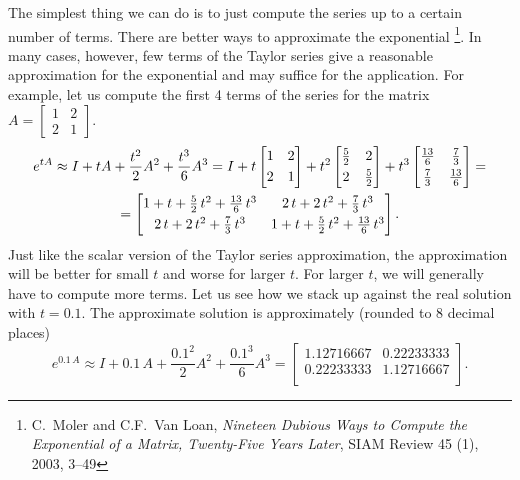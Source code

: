 The simplest thing we can do
is to just compute the series up to a certain number of terms.  There
are better ways to approximate the exponential%
\footnote{C.\ Moler and C.F.\ Van Loan, \emph{Nineteen Dubious Ways
to Compute the Exponential of a Matrix, Twenty-Five Years Later}, SIAM Review
45 (1), 2003, 3--49}.  In many cases, however,
few terms of the Taylor series give
a reasonable approximation for the exponential and may suffice for
the application.  For example, let us compute the first 4 terms of the
series for the matrix $A = 
\left[ \begin{smallmatrix}
1 & 2 \\
2 & 1
\end{smallmatrix} \right]$.
\begin{multline*}
e^{tA}
\approx
I + tA + \frac{t^2}{2}A^2 + \frac{t^3}{6}A^3
=
I + t
\begin{bmatrix}
1 & 2 \\
\noalign{\smallskip}
2 & 1
\end{bmatrix}
+ t^2
\begin{bmatrix}
\frac{5}{2} & 2 \\
\noalign{\smallskip}
2 & \frac{5}{2}
\end{bmatrix}
+ t^3
\begin{bmatrix}
\frac{13}{6} & \frac{7}{3} \\
\noalign{\smallskip}
\frac{7}{3} & \frac{13}{6}
\end{bmatrix}
=
\\
=
\begin{bmatrix}
1 + t + \frac{5}{2}\, t^2 + \frac{13}{6}\, t^3 &
   2\,t + 2\, t^2   + \frac{7}{3}\, t^3 \\
\noalign{\smallskip}
   2\,t + 2\, t^2   + \frac{7}{3}\, t^3 &
1 + t + \frac{5}{2}\, t^2 + \frac{13}{6}\, t^3
\end{bmatrix} .
\end{multline*}
Just like the scalar version of the Taylor series approximation, the
approximation will be better for small $t$ and worse for larger $t$.  For
larger $t$, we will generally have to compute more terms.
Let us see how we stack up against the real solution with $t=0.1$.  The
approximate solution is approximately (rounded to 8 decimal places)
\begin{equation*}
e^{0.1\,A} \approx
I + 0.1\,A + \frac{0.1^2}{2}A^2 + \frac{0.1^3}{6}A^3
=
\begin{bmatrix}
1.12716667 & 0.22233333 \\
0.22233333 & 1.12716667 \\
\end{bmatrix} .
\end{equation*}
